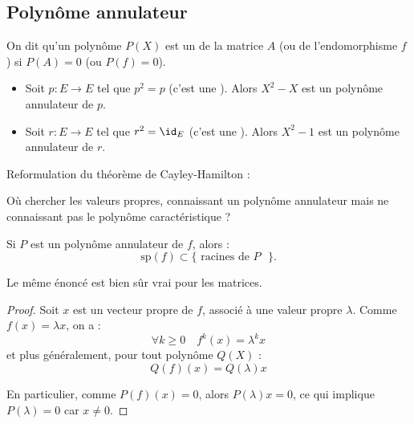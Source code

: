 \documentclass[12pt, class=report,crop=false]{standalone}
\newcommand{\Sp}{\text{sp}}
\begin{document}
\subsection{Polynôme annulateur}


\begin{definition}
On dit qu'un polynôme $P(X)$ est un  de la matrice $A$ (ou de l'endomorphisme $f$) si $P(A) =0$ (ou $P(f) = 0$). 
\end{definition}

\begin{exemple}
\sauteligne
\begin{itemize}

  \item Soit $p : E \to E$ tel que $p ^2=p$ (c'est une ). Alors $X^2-X$ est un polynôme annulateur de $p$.

  \item Soit $r : E \to E$ tel que $r^2 =\id_E$ (c'est une ). Alors $X^2-1$ est un polynôme annulateur de $r$.
\end{itemize}
\end{exemple}

Reformulation du théorème de Cayley-Hamilton : 



Où chercher les valeurs propres, connaissant un polynôme annulateur mais ne connaissant pas le polynôme caractéristique ?
\begin{proposition}
Si $P$ est un polynôme annulateur de $f$, alors :
\[\Sp (f) \subset \{\text{ racines de $P$ }\}.\]
\end{proposition}
Le même énoncé est bien sûr vrai pour les matrices.

\begin{proof}
Soit $x$ est un vecteur propre de $f$, associé à une valeur propre $\lambda$.
Comme $f(x) = \lambda x$, on a :
\[\forall k \ge 0 \quad f^k(x) = \lambda^k x\]
et plus généralement, pour tout polynôme $Q(X)$ :
\[Q(f)(x) = Q(\lambda)x \]

En particulier, comme $P(f)(x)=0$, alors $P(\lambda) x =0$, ce qui implique 
$P(\lambda) = 0$ car $x \neq 0$.
\end{proof}
\end{document}
